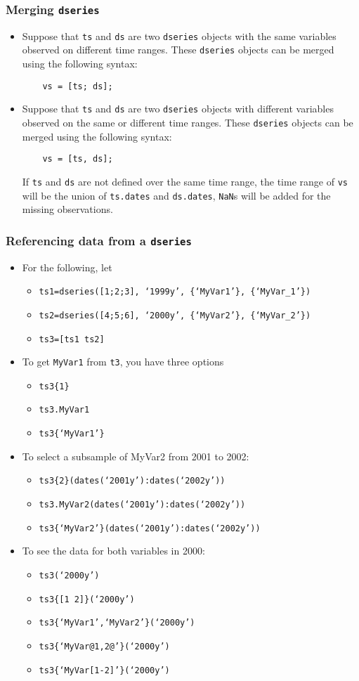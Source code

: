 \documentclass[10pt]{beamer}
\newcommand{\myitem}{\item[$\bullet$]}
\begin{document}
\begin{frame}[fragile,t]
  \frametitle{Merging \texttt{dseries}}
  \begin{itemize}
    \myitem Suppose that \verb+ts+ and \verb+ds+ are two \texttt{dseries} objects
    with the same variables observed on different time ranges. These
    \texttt{dseries} objects can be merged using the following syntax:
\begin{verbatim}
    vs = [ts; ds];
\end{verbatim}
\myitem Suppose that \verb+ts+ and \verb+ds+ are two \texttt{dseries} objects
with different variables observed on the same or different time ranges. These
\texttt{dseries} objects can be merged using the following syntax:
\begin{verbatim}
    vs = [ts, ds];
\end{verbatim}
If \verb+ts+ and \verb+ds+ are not defined over the same time range,
the time range of \verb+vs+ will be the union of \verb+ts.dates+ and
\verb+ds.dates+, \verb+NaN+s will be added for the missing observations.
  \end{itemize}
\end{frame}





\begin{frame}[fragile,t]
  \frametitle{Referencing data from a \texttt{dseries}}
  \begin{itemize}
  \myitem For the following, let
    \begin{itemize}
    \myitem \texttt{ts1=dseries([1;2;3], `1999y', \{`MyVar1'\}, \{`MyVar\_1'\})}
    \myitem \texttt{ts2=dseries([4;5;6], `2000y', \{`MyVar2'\}, \{`MyVar\_2'\})}
    \myitem \texttt{ts3=[ts1 ts2]}
    \end{itemize}
  \myitem To get \texttt{MyVar1} from \texttt{t3}, you have three options
    \begin{itemize}
      \myitem \texttt{ts3\{1\}}
      \myitem \texttt{ts3.MyVar1}
      \myitem \texttt{ts3\{`MyVar1'\}}
    \end{itemize}
  \myitem To select a subsample of MyVar2 from 2001 to 2002:
    \begin{itemize}
      \myitem \texttt{ts3\{2\}(dates(`2001y'):dates(`2002y'))}
      \myitem \texttt{ts3.MyVar2(dates(`2001y'):dates(`2002y'))}
      \myitem \texttt{ts3\{`MyVar2'\}(dates(`2001y'):dates(`2002y'))}
    \end{itemize}
  \myitem To see the data for both variables in 2000:
    \begin{itemize}
      \myitem \texttt{ts3(`2000y')}
      \myitem \texttt{ts3\{[1 2]\}(`2000y')}
      \myitem \texttt{ts3\{`MyVar1',`MyVar2'\}(`2000y')}
      \myitem \texttt{ts3\{`MyVar@1,2@'\}(`2000y')}
      \myitem \texttt{ts3\{`MyVar[1-2]'\}(`2000y')}
    \end{itemize}
  \end{itemize}
\end{frame}
\end{document}
